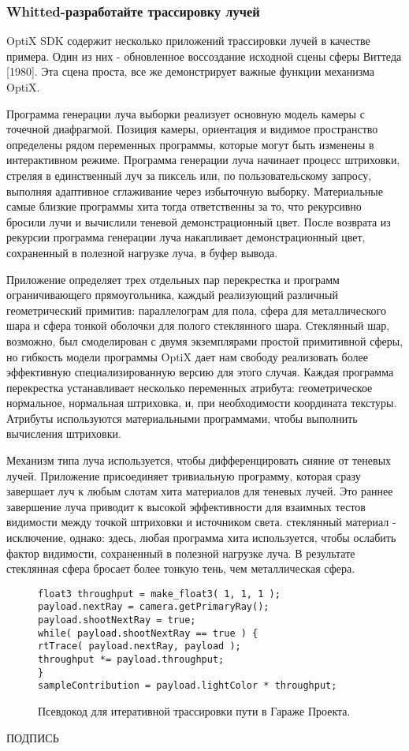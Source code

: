 \subsubsection{Whitted-разработайте трассировку лучей}
OptiX SDK содержит несколько приложений трассировки лучей в качестве примера. Один из них - обновленное воссоздание исходной сцены сферы Виттеда [1980]. Эта сцена проста, все же демонстрирует важные функции механизма OptiX.

Программа генерации луча выборки реализует основную модель камеры с точечной диафрагмой. Позиция камеры, ориентация и видимое пространство определены рядом переменных программы, которые могут быть изменены в интерактивном режиме. Программа генерации луча начинает процесс штриховки, стреляя в единственный луч за пиксель или, по пользовательскому запросу, выполняя адаптивное сглаживание через избыточную выборку. Материальные самые близкие программы хита тогда ответственны за то, что рекурсивно бросили лучи и вычислили теневой демонстрационный цвет. После возврата из рекурсии программа генерации луча накапливает демонстрационный цвет, сохраненный в полезной нагрузке луча, в буфер вывода.

Приложение определяет трех отдельных пар перекрестка и программ ограничивающего прямоугольника, каждый реализующий различный геометрический примитив: параллелограм для пола, сфера для металлического шара и сфера тонкой оболочки для полого стеклянного шара. Стеклянный шар, возможно, был смоделирован с двумя экземплярами простой примитивной сферы, но гибкость модели программы OptiX дает нам свободу реализовать более эффективную специализированную версию для этого случая. Каждая программа перекрестка устанавливает несколько переменных атрибута: геометрическое нормальное, нормальная штриховка, и, при необходимости координата текстуры. Атрибуты используются материальными программами, чтобы выполнить вычисления штриховки.

  Механизм типа луча используется, чтобы дифференцировать сияние от теневых лучей. Приложение присоединяет тривиальную программу, которая сразу завершает луч к любым слотам хита материалов для теневых лучей. Это раннее завершение луча приводит к высокой эффективности для взаимных тестов видимости между точкой штриховки и источником света.
стеклянный материал - исключение, однако: здесь, любая программа хита используется, чтобы ослабить фактор видимости, сохраненный в полезной нагрузке луча. В результате стеклянная сфера бросает более тонкую тень, чем металлическая сфера.
\begin{figure}[h!]
\begin{verbatim}
float3 throughput = make_float3( 1, 1, 1 );
payload.nextRay = camera.getPrimaryRay();
payload.shootNextRay = true;
while( payload.shootNextRay == true ) {
rtTrace( payload.nextRay, payload );
throughput *= payload.throughput;
}
sampleContribution = payload.lightColor * throughput;
\end{verbatim}
\caption{Псевдокод для итеративной трассировки пути в Гараже Проекта.}
\label{fig6}
\end{figure}
ПОДПИСЬ
